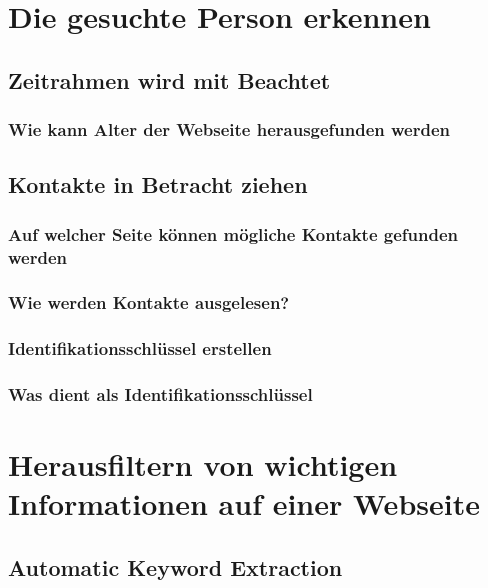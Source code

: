 \section{Die gesuchte Person erkennen}
	\subsection{Zeitrahmen wird mit Beachtet}
		\subsubsection{Wie kann Alter der Webseite herausgefunden werden}
	\subsection{Kontakte in Betracht ziehen}
		\subsubsection{Auf welcher Seite können mögliche Kontakte gefunden werden}
		\subsubsection{Wie werden Kontakte ausgelesen?}
	\subsubsection{Identifikationsschlüssel erstellen}
		\subsubsection{Was dient als Identifikationsschlüssel}
		
\section{Herausfiltern von wichtigen Informationen auf einer Webseite}
	\subsection{Automatic Keyword Extraction}%
